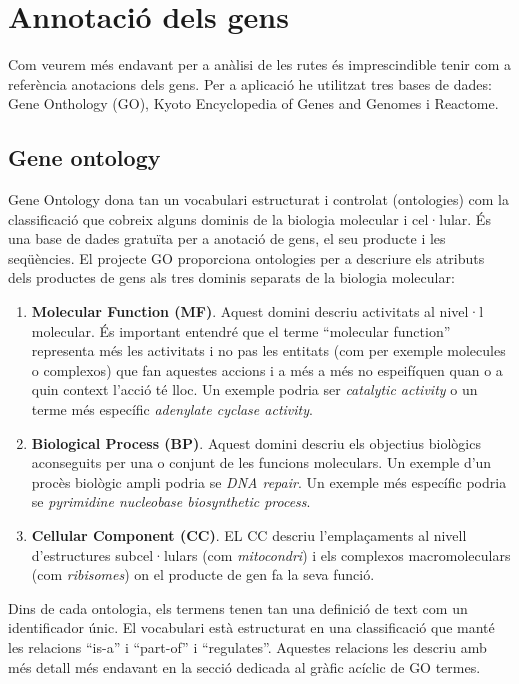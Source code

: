 \section{Annotació dels gens}
Com veurem més endavant per a anàlisi de les rutes és imprescindible tenir com a referència anotacions dels gens. Per a aplicació he utilitzat tres bases de dades: Gene Onthology (GO), Kyoto Encyclopedia of Genes and Genomes i Reactome. 

\subsection{Gene ontology}
Gene Ontology \cite{gene2004gene} dona tan un vocabulari estructurat i controlat (ontologies) com la classificació que cobreix alguns dominis de la biologia molecular i cel·lular. És una base de dades gratuïta per a anotació de gens, el seu producte i les seqüències. El projecte GO proporciona ontologies per a descriure els atributs dels productes de gens als tres dominis separats de la biologia molecular:
\begin{enumerate}
\item \textbf{Molecular Function (MF)}. Aquest domini descriu activitats al nivel·l molecular. És important entendré que el terme ``molecular function'' representa més les activitats i no pas les entitats (com per exemple molecules o complexos) que fan aquestes accions i a més a més no espeifíquen quan o a quin context l'acció té lloc. Un exemple podria ser \textit{catalytic activity} o un terme més específic \textit{adenylate cyclase activity}.
\item \textbf{Biological Process (BP)}. Aquest domini descriu els objectius biològics aconseguits per una o conjunt de les funcions moleculars. Un exemple d'un procès biològic ampli podria se \textit{DNA repair}. Un exemple més específic podria se \textit{pyrimidine nucleobase biosynthetic process}. 
\item \textbf{Cellular Component (CC)}. EL CC descriu l'emplaçaments al nivell d'estructures subcel·lulars (com \textit{mitocondri}) i els complexos macromoleculars (com \textit{ribisomes}) on el producte de gen fa la seva funció.
\end{enumerate}

Dins de cada ontologia, els termens tenen tan una definició de text com un identificador únic. El vocabulari està estructurat en una classificació que manté les relacions ``is-a'' i ``part-of'' i ``regulates''. Aquestes relacions les descriu amb més detall més endavant en la secció dedicada al gràfic acíclic de GO termes.

